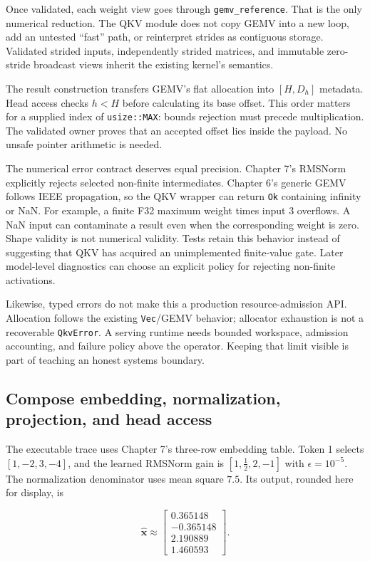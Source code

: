 \documentclass[
  10pt,
]{article}
\begin{document}
Once validated, each weight view goes through \texttt{gemv\_reference}.
That is the only numerical reduction. The QKV module does not copy GEMV
into a new loop, add an untested ``fast'' path, or reinterpret strides
as contiguous storage. Validated strided inputs, independently strided
matrices, and immutable zero-stride broadcast views inherit the existing
kernel's semantics.

The result construction transfers GEMV's flat allocation into
\([H,D_h]\) metadata. Head access checks \(h<H\) before calculating its
base offset. This order matters for a supplied index of
\texttt{usize::MAX}: bounds rejection must precede multiplication. The
validated owner proves that an accepted offset lies inside the payload.
No unsafe pointer arithmetic is needed.

The numerical error contract deserves equal precision. Chapter 7's
RMSNorm explicitly rejects selected non-finite intermediates. Chapter
6's generic GEMV follows IEEE propagation, so the QKV wrapper can return
\texttt{Ok} containing infinity or NaN. For example, a finite F32
maximum weight times input 3 overflows. A NaN input can contaminate a
result even when the corresponding weight is zero. Shape validity is not
numerical validity. Tests retain this behavior instead of suggesting
that QKV has acquired an unimplemented finite-value gate. Later
model-level diagnostics can choose an explicit policy for rejecting
non-finite activations.

Likewise, typed errors do not make this a production resource-admission
API. Allocation follows the existing \texttt{Vec}/GEMV behavior;
allocator exhaustion is not a recoverable \texttt{QkvError}. A serving
runtime needs bounded workspace, admission accounting, and failure
policy above the operator. Keeping that limit visible is part of
teaching an honest systems boundary.

\subsection{Compose embedding, normalization, projection, and head
access}\label{compose-embedding-normalization-projection-and-head-access}

The executable trace uses Chapter 7's three-row embedding table. Token 1
selects \([1,-2,3,-4]\), and the learned RMSNorm gain is
\([1,\tfrac12,2,-1]\) with \(\epsilon=10^{-5}\). The normalization
denominator uses mean square \(7.5\). Its output, rounded here for
display, is

\[
\widehat{\mathbf{x}}\approx
\begin{bmatrix}
0.365148\\-0.365148\\2.190889\\1.460593
\end{bmatrix}.
\]
\end{document}
